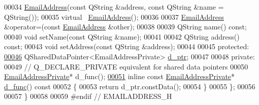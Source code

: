 \begin{DoxyCode}
00034     \hyperlink{class_simple_mail_1_1_email_address}{EmailAddress}(\textcolor{keyword}{const} QString &address, \textcolor{keyword}{const} QString &name = QString());
00035     \textcolor{keyword}{virtual} ~\hyperlink{class_simple_mail_1_1_email_address}{EmailAddress}();
00036 
00037     \hyperlink{class_simple_mail_1_1_email_address}{EmailAddress} &operator=(\textcolor{keyword}{const} \hyperlink{class_simple_mail_1_1_email_address}{EmailAddress} &other);
00038 
00039     QString name() \textcolor{keyword}{const};
00040     \textcolor{keywordtype}{void} setName(\textcolor{keyword}{const} QString &name);
00041 
00042     QString address() \textcolor{keyword}{const};
00043     \textcolor{keywordtype}{void} setAddress(\textcolor{keyword}{const} QString &address);
00044 
00045 \textcolor{keyword}{protected}:
\hyperlink{class_simple_mail_1_1_email_address_a27188c75c77a942e79cac0420788f214}{00046}     QSharedDataPointer<EmailAddressPrivate> \hyperlink{class_simple_mail_1_1_email_address_a27188c75c77a942e79cac0420788f214}{d\_ptr};
00047 
00048 \textcolor{keyword}{private}:
00049     \textcolor{comment}{// Q\_DECLARE\_PRIVATE equivalent for shared data pointers}
00050     \hyperlink{class_simple_mail_1_1_email_address_private}{EmailAddressPrivate}* d\_func();
\hyperlink{class_simple_mail_1_1_email_address_a70c5d2b0aabacfdfa692710f43cf0b5e}{00051}     \textcolor{keyword}{inline} \textcolor{keyword}{const} \hyperlink{class_simple_mail_1_1_email_address_private}{EmailAddressPrivate}* \hyperlink{class_simple_mail_1_1_email_address_a70c5d2b0aabacfdfa692710f43cf0b5e}{d\_func}()\textcolor{keyword}{ const}
00052 \textcolor{keyword}{    }\{
00053         \textcolor{keywordflow}{return} d\_ptr.constData();
00054     \}
00055 \};
00056 
00057 \}
00058 
00059 \textcolor{preprocessor}{#endif // EMAILADDRESS\_H}
\end{DoxyCode}
